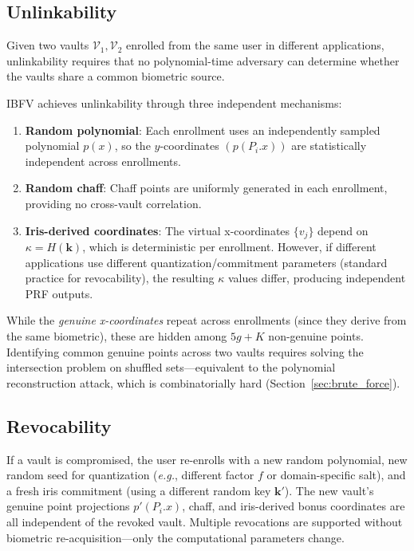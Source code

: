 \documentclass[conference]{IEEEtran}
\newcommand{\IBFV}{\textsf{IBFV}}
\newcommand{\eg}{\textit{e.g.}}
\begin{document}
\subsection{Unlinkability}
\label{sec:unlinkability}

Given two vaults $\mathcal{V}_1, \mathcal{V}_2$ enrolled from the same user in different applications, unlinkability requires that no polynomial-time adversary can determine whether the vaults share a common biometric source.

\IBFV{} achieves unlinkability through three independent mechanisms:
\begin{enumerate}
    \item \textbf{Random polynomial}: Each enrollment uses an independently sampled polynomial $p(x)$, so the $y$-coordinates $(p(P_i.x))$ are statistically independent across enrollments.
    \item \textbf{Random chaff}: Chaff points are uniformly generated in each enrollment, providing no cross-vault correlation.
    \item \textbf{Iris-derived coordinates}: The virtual x-coordinates $\{v_j\}$ depend on $\kappa = H(\mathbf{k})$, which is deterministic per enrollment. However, if different applications use different quantization/commitment parameters (standard practice for revocability), the resulting $\kappa$ values differ, producing independent PRF outputs.
\end{enumerate}

\noindent While the \emph{genuine x-coordinates} repeat across enrollments (since they derive from the same biometric), these are hidden among $5g + K$ non-genuine points. Identifying common genuine points across two vaults requires solving the intersection problem on shuffled sets---equivalent to the polynomial reconstruction attack, which is combinatorially hard (Section~\ref{sec:brute_force}).

\subsection{Revocability}
\label{sec:revocability}

If a vault is compromised, the user re-enrolls with a new random polynomial, new random seed for quantization (\eg{}, different factor $f$ or domain-specific salt), and a fresh iris commitment (using a different random key $\mathbf{k}'$). The new vault's genuine point projections $p'(P_i.x)$, chaff, and iris-derived bonus coordinates are all independent of the revoked vault. Multiple revocations are supported without biometric re-acquisition---only the computational parameters change.
\end{document}
